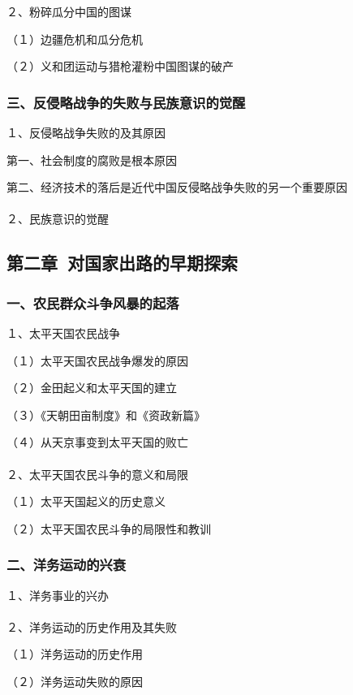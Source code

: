 \documentclass{ctexart}
\begin{document}
２、粉碎瓜分中国的图谋

（１）边疆危机和瓜分危机

（２）义和团运动与猎枪灌粉中国图谋的破产

\subsubsection{三、反侵略战争的失败与民族意识的觉醒}

１、反侵略战争失败的及其原因

第一、社会制度的腐败是根本原因

第二、经济技术的落后是近代中国反侵略战争失败的另一个重要原因
\\\\

２、民族意识的觉醒



\subsection{第二章\ 对国家出路的早期探索}

\subsubsection{一、农民群众斗争风暴的起落}

１、太平天国农民战争

（１）太平天国农民战争爆发的原因

（２）金田起义和太平天国的建立

（３）《天朝田亩制度》和《资政新篇》

（４）从天京事变到太平天国的败亡
\\\\


２、太平天国农民斗争的意义和局限

（１）太平天国起义的历史意义

（２）太平天国农民斗争的局限性和教训

\subsubsection{二、洋务运动的兴衰}

１、洋务事业的兴办　
\\\\


２、洋务运动的历史作用及其失败

（１）洋务运动的历史作用

（２）洋务运动失败的原因
\end{document}

